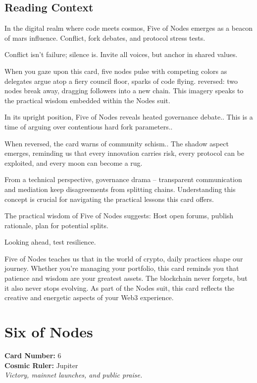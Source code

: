 \documentclass[11pt,oneside]{book}
\begin{document}
\begin{minipage}[t]{0.55\textwidth}
  \subsection*{Reading Context}
  In the digital realm where code meets cosmos, Five of Nodes emerges as a beacon of mars influence. Conflict, fork debates, and protocol stress tests.

  Conflict isn't failure; silence is. Invite all voices, but anchor in shared values.

  When you gaze upon this card, five nodes pulse with competing colors as delegates argue atop a fiery council floor, sparks of code flying. reversed: two nodes break away, dragging followers into a new chain. This imagery speaks to the practical wisdom embedded within the Nodes suit.

  In its upright position, Five of Nodes reveals heated governance debate.. This is a time of arguing over contentious hard fork parameters..

  When reversed, the card warns of community schism.. The shadow aspect emerges, reminding us that every innovation carries risk, every protocol can be exploited, and every moon can become a rug.

  From a technical perspective, governance drama – transparent communication and mediation keep disagreements from splitting chains. Understanding this concept is crucial for navigating the practical lessons this card offers.

  The practical wisdom of Five of Nodes suggests: Host open forums, publish rationale, plan for potential splits.

  Looking ahead, test resilience.

  Five of Nodes teaches us that in the world of crypto, daily practices shape our journey. Whether you're managing your portfolio, this card reminds you that patience and wisdom are your greatest assets. The blockchain never forgets, but it also never stops evolving. As part of the Nodes suit, this card reflects the creative and energetic aspects of your Web3 experience.

\end{minipage}

\newpage
\section*{Six of Nodes}

\begin{minipage}[t]{0.55\textwidth}
  \vspace{0pt}
  \textbf{Card Number:} 6\\  \textbf{Cosmic Ruler:} Jupiter\\  \textit{Victory, mainnet launches, and public praise.}
\end{minipage}
\end{document}
